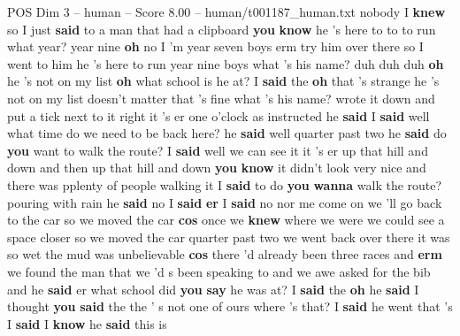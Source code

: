 \begin{textsample}{POS Dim 3 – human – Score 8.00 – human/t001187\_human.txt}  \label{ex:f3_pos_012}
nobody I \textbf{knew} so I just \textbf{said} to a man that had a clipboard \textbf{you} \textbf{know} he 's here to to to run what year? year nine \textbf{oh} no I 'm year seven boys erm try him over there so I went to him he 's here to run year nine boys what 's his name? duh duh duh \textbf{oh} he 's not on my list \textbf{oh} what school is he at?
I \textbf{said} the \textbf{oh} that 's strange he 's not on my list doesn't matter that 's fine what 's his name? wrote it down and put a tick next to it right it 's er one o'clock as instructed he \textbf{said} I \textbf{said} well what time do we need to be back here? he \textbf{said} well quarter past two he \textbf{said} do \textbf{you} want to walk the route?
I \textbf{said} well we can see it it 's er up that hill and down and then up that hill and down \textbf{you} \textbf{know} it didn't look very nice and there was pplenty of people walking it I \textbf{said} to do \textbf{you} \textbf{wanna} walk the route? pouring with rain he \textbf{said} no I \textbf{said} \textbf{er} I \textbf{said} no nor me come on we 'll go back to the car so we moved the car \textbf{cos} once we \textbf{knew} where we were we could see a space closer so we moved the car quarter past two we went back over there it was so wet the mud was unbelievable \textbf{cos} there 'd already been three races and \textbf{erm} we found the man that we 'd s been speaking to and we awe asked for the bib and he \textbf{said} er what school did \textbf{you} \textbf{say} he was at?
I \textbf{said} the \textbf{oh} he \textbf{said} I thought \textbf{you} \textbf{said} the the ' s not one of ours where 's that?
I \textbf{said} he went that 's I \textbf{said} I \textbf{know} he \textbf{said} this is

\end{textsample}
